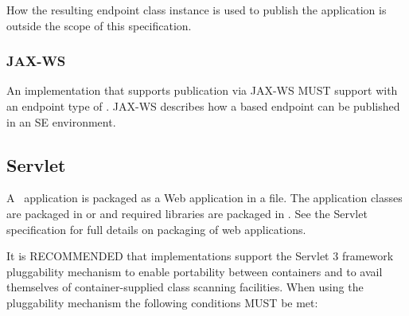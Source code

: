 How the resulting endpoint class instance is used to publish the application is outside the scope of this specification.

\subsubsection{JAX-WS}

An implementation that supports publication via JAX-WS MUST support  with an endpoint type of . JAX-WS describes how a  based endpoint can be published in an SE environment.

\subsection{Servlet}
\label{servlet}

A \jaxrs\ application is packaged as a Web application in a  file. The application classes are packaged in  or  and required libraries are packaged in . See the Servlet specification for full details on packaging of web applications.

It is RECOMMENDED that implementations support the Servlet 3 framework pluggability mechanism to enable portability between containers and to avail themselves of container-supplied class scanning facilities. When using the pluggability mechanism the following conditions MUST be met:

